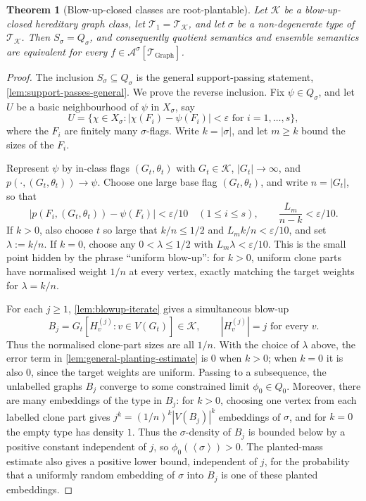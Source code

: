 \documentclass[11pt]{article}
\newtheorem{theorem}{Theorem}
\theoremstyle{definition}
\newcommand{\A}{\mathcal{A}}
\newcommand{\K}{\mathcal{K}}
\newcommand{\T}{\mathcal{T}}
\newcommand{\brak}[1]{\left\langle #1\right\rangle}
\newcommand{\eps}{\varepsilon}
\begin{document}
\begin{theorem}[Blow-up-closed classes are root-plantable]\label{thm:blowup-root-plantable}
Let $\K$ be a blow-up-closed hereditary graph class, let $\T_1=\T_\K$, and let $\sigma$
be a non-degenerate type of $\T_\K$.  Then $S_\sigma=Q_\sigma$, and consequently
quotient semantics and ensemble semantics are equivalent for every
$f\in\A^\sigma[\T_{\mathrm{Graph}}]$.
\end{theorem}

\begin{proof}
The inclusion $S_\sigma\subseteq Q_\sigma$ is the general support-passing statement,
\cref{lem:support-passes-general}.  We prove the reverse inclusion.  Fix
$\psi\in Q_\sigma$, and let $U$ be a basic neighbourhood of $\psi$ in $X_\sigma$, say
\[
  U=\{\chi\in X_\sigma:
      |\chi(F_i)-\psi(F_i)|<\eps\text{ for }i=1,\ldots,s\},
\]
where the $F_i$ are finitely many $\sigma$-flags.  Write $k=|\sigma|$, and let
$m\ge k$ bound the sizes of the $F_i$.

Represent $\psi$ by in-class flags $(G_t,\theta_t)$ with $G_t\in\K$,
$|G_t|\to\infty$, and $p(\cdot,(G_t,\theta_t))\to\psi$.  Choose one large base flag
$(G_t,\theta_t)$, and write $n=|G_t|$, so that
\[
  |p(F_i,(G_t,\theta_t))-\psi(F_i)|<\eps/10
  \quad(1\le i\le s),
  \qquad
  \frac{L_m}{n-k}<\eps/10.
\]
If $k>0$, also choose $t$ so large that $k/n\le1/2$ and $L_m k/n<\eps/10$, and set
$\lambda:=k/n$.  If $k=0$, choose any $0<\lambda\le1/2$ with
$L_m\lambda<\eps/10$.  This is the small point hidden by the phrase ``uniform blow-up'':
for $k>0$, uniform clone parts have normalised weight $1/n$ at every vertex, exactly
matching the target weights for $\lambda=k/n$.

For each $j\ge1$, \cref{lem:blowup-iterate} gives a simultaneous blow-up
\[
  B_j=G_t[H_v^{(j)}:v\in V(G_t)]\in\K,
  \qquad |H_v^{(j)}|=j\text{ for every }v.
\]
Thus the normalised clone-part sizes are all $1/n$.  With the choice of $\lambda$ above,
the error term in \cref{lem:general-planting-estimate} is $0$ when $k>0$; when $k=0$ it is
also $0$, since the target weights are uniform.  Passing to a subsequence, the unlabelled
graphs $B_j$ converge to some constrained limit $\phi_0\in Q_0$.  Moreover, there are
many embeddings of the type in $B_j$: for $k>0$, choosing one vertex from each labelled
clone part gives $j^k=(1/n)^k|V(B_j)|^k$ embeddings of $\sigma$, and for $k=0$ the
empty type has density $1$.  Thus the $\sigma$-density of $B_j$ is
bounded below by a positive constant independent of $j$, so
$\phi_0(\brak\sigma)>0$.  The planted-mass estimate also gives a positive lower bound,
independent of $j$, for the probability that a uniformly random embedding of
$\sigma$ into $B_j$ is one of these planted embeddings.


\end{proof}
\end{document}
